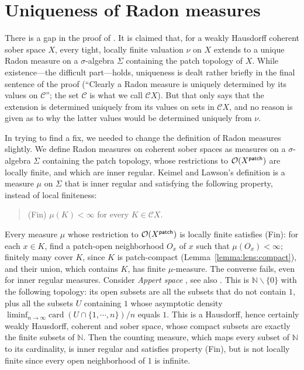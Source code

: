 \documentclass[preprint,12pt]{elsarticle}
\newcommand\diff{\smallsetminus}
\newcommand\nat{\mathbb{N}}
\newcommand\Open{{\mathcal O}}
\newcommand\patch{{\text{\textsf{patch}}}}
\begin{document}
\appendix

\section{Uniqueness of Radon measures}
\label{sec:KL}

There is a gap in the proof of \cite[Theorem~7.3]{KL:measureext}.  It
is claimed that, for a weakly Hausdorff coherent sober space $X$,
every tight, locally finite valuation $\nu$ on $X$ extends to a unique
Radon measure on a $\sigma$-algebra $\Sigma$ containing the patch
topology of $X$.  While existence---the difficult part---holds,
uniqueness is dealt rather briefly in the final sentence of the proof
(``Clearly a Radon measure is uniquely determined by its values on
$\mathcal C$''; the set $\mathcal C$ is what we call $\mathcal C X$).
But that only says that the extension is determined uniquely from its
values on sets in $\mathcal C X$, and no reason is given as to why the
latter values would be determined uniquely from $\nu$.

In trying to find a fix, we needed to change the definition of Radon
measures slightly.  We define Radon measures on coherent sober spaces
as measures on a $\sigma$-algebra $\Sigma$ containing the patch
topology, whose restrictions to $\Open {(X^\patch)}$ are locally
finite, and which are inner regular.  Keimel and Lawson's definition
\cite[Definition~7.2]{KL:measureext} is a measure $\mu$ on $\Sigma$
that is inner regular and satisfying the following property, instead
of local finiteness:
\begin{quote}
  (Fin) $\mu (K) < \infty$ for every $K \in \mathcal C X$.
\end{quote}
Every measure $\mu$ whose restriction to $\Open {(X^\patch)}$ is
locally finite satisfies (Fin): for each $x \in K$, find a patch-open
neighborhood $O_x$ of $x$ such that $\mu (O_x) < \infty$; finitely
many cover $K$, since $K$ is patch-compact
(Lemma~\ref{lemma:lens:compact}), and their union, which contains $K$,
has finite $\mu$-measure.  The converse fails, even for inner regular
measures.  Consider \emph{Appert space} \cite[Chapter~VIII, \S~II,
p.84]{Appert:abs}, see also
\cite[Counterexample~98]{SS:countexamples}.  This is
$\nat \diff \{0\}$ with the following topology: its open subsets are
all the subsets that do not contain $1$, plus all the subsets $U$
containing $1$ whose asymptotic density
$\liminf_{n \to \infty} \mathrm{card}\; (U \cap \{1, \cdots, n\})/n$
equals $1$.  This is a Hausdorff, hence certainly weakly Hausdorff,
coherent and sober space, whose compact subsets are exactly the finite
subsets of $\nat$.  Then the counting measure, which maps every subset
of $\nat$ to its cardinality, is inner regular and satisfies property
(Fin), but is not locally finite since every open neighborhood of $1$
is infinite.
\end{document}
